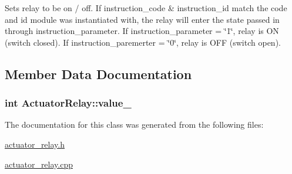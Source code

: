 Sets relay to be on / off. If instruction\+\_\+code \& instruction\+\_\+id match the code and id module was instantiated with, the relay will enter the state passed in through instruction\+\_\+parameter. If instruction\+\_\+parameter = \char`\"{}1\char`\"{}, relay is O\+N (switch closed). If instruction\+\_\+paremerter = \char`\"{}0\char`\"{}, relay is O\+F\+F (switch open). 



\subsection{Member Data Documentation}
\hypertarget{class_actuator_relay_a8f63c9df6e8dfc90425838f6c1c8fb0e}{}
\subsubsection[{value\+\_\+}]{\setlength{\rightskip}{0pt plus 5cm}int Actuator\+Relay\+::value\+\_\+}\label{class_actuator_relay_a8f63c9df6e8dfc90425838f6c1c8fb0e}


The documentation for this class was generated from the following files\+:\begin{DoxyCompactItemize}
\item 
\hyperlink{actuator__relay_8h}{actuator\+\_\+relay.\+h}\item 
\hyperlink{actuator__relay_8cpp}{actuator\+\_\+relay.\+cpp}\end{DoxyCompactItemize}
